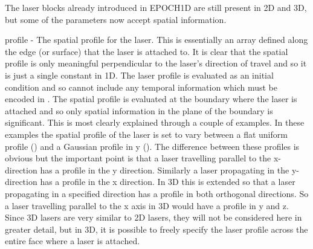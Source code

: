 The laser blocks already introduced in EPOCH1D are still present in
2D and 3D, but some of the parameters now accept spatial information.\\


{\emphtext profile} - The spatial profile for the laser. This is
essentially an array defined along the edge (or surface) that the laser is
attached to. It is clear that the spatial profile is only meaningful
perpendicular to the laser's direction of travel and so it is just a single
constant in 1D. The laser profile is evaluated as an initial condition
and so cannot include any temporal information which must be
encoded in .  The spatial profile is evaluated at the
boundary where the laser is attached and so only spatial information in the
plane of the boundary is significant. This is most clearly explained through a
couple of examples. In these examples the spatial profile of the laser is set
to vary between a flat uniform profile () and a
Gaussian profile in y (). The
difference between these profiles is obvious but the important point is that a
laser travelling parallel to the x-direction has a profile in the y
direction. Similarly a laser propagating in the y-direction has a profile in
the x direction. In 3D this is extended so that a laser propagating in a
specified direction has a profile in both orthogonal directions. So a laser
travelling parallel to the x axis in 3D would have a profile in y and z. Since
3D lasers are very similar to 2D lasers, they will not be considered here in
greater detail, but in 3D, it is possible to freely specify the laser profile
across the entire face where a laser is attached.\\


